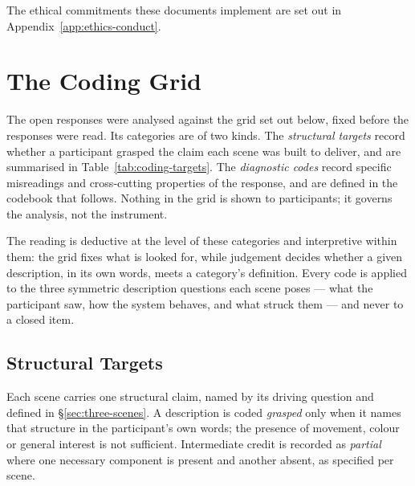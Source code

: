 The ethical commitments these documents implement are set out in Appendix~\ref{app:ethics-conduct}.

\section{The Coding Grid}
\label{sec:app-coding-grid}

The open responses were analysed against the grid set out below, fixed before the responses were read. Its categories are of two kinds. The \emph{structural targets} record whether a participant grasped the claim each scene was built to deliver, and are summarised in Table~\ref{tab:coding-targets}. The \emph{diagnostic codes} record specific misreadings and cross-cutting properties of the response, and are defined in the codebook that follows. Nothing in the grid is shown to participants; it governs the analysis, not the instrument.

The reading is deductive at the level of these categories and interpretive within them: the grid fixes what is looked for, while judgement decides whether a given description, in its own words, meets a category's definition. Every code is applied to the three symmetric description questions each scene poses --- what the participant saw, how the system behaves, and what struck them --- and never to a closed item.

\subsection{Structural Targets}
\label{subsec:app-targets}

Each scene carries one structural claim, named by its driving question and defined in \S\ref{sec:three-scenes}. A description is coded \emph{grasped} only when it names that structure in the participant's own words; the presence of movement, colour or general interest is not sufficient. Intermediate credit is recorded as \emph{partial} where one necessary component is present and another absent, as specified per scene.

